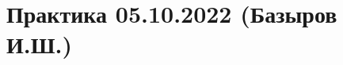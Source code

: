 \documentclass[main.tex]{subfiles}
\begin{document}

\section{Практика 05.10.2022 (Базыров И.Ш.)}
\end{document}
